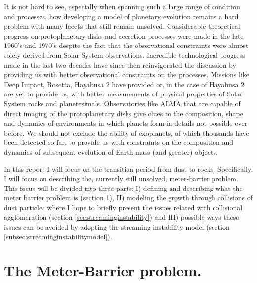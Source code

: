 \documentclass[12pt]{article}
\begin{document}
It is not hard to see, especially when spanning such a large range of condition and processes, how developing a model of planetary evolution remains a hard problem with many facets that still remain unsolved. Considerable theoretical progress on protoplanetary disks and accretion processes were made in the late 1960's and 1970's despite the fact that the observational constraints were almost solely derived from Solar System observations. Incredible technological progress made in the last two decades have since then reinvigorated the discussion by providing us with better observational constraints on the processes. Missions like Deep Impact, Rosetta, Hayabusa 2 have provided or, in the case of Hayabusa 2 are yet to provide us, with better measurements of physical properties of Solar System rocks and planetesimals. Observatories like ALMA that are capable of direct imaging of the protoplanetary disks give clues to the composition, shape and dynamics of environments in which planets form in details not possible ever before. We should not exclude the ability of exoplanets, of which thousands have been detected so far, to provide us with constraints on the composition and dynamics of subsequent evolution of Earth mass (and greater) objects. 

In this report I will focus on the transition period from dust to rocks. Specifically, I will focus on describing the, currently still unsolved, meter-barrier problem. This focus will be divided into three parts: I) defining and describing what the meter barrier problem is (section \ref{sec:metermarrierproblem}), II) modeling the growth through collisions of dust particles where I hope to briefly present the issues related with collisional agglomeration (section \ref{sec:streaminginstability}) and III) possible ways these issues can be avoided by adopting the streaming instability model (section \ref{subsec:streaminginstabilitymodel}).

\section{The Meter-Barrier problem.}
\label{sec:metermarrierproblem}
\end{document}
